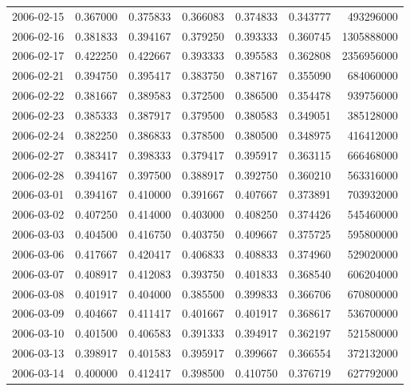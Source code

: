 \begin{tabular}{lrrrrrr}
2006-02-15 &    0.367000 &    0.375833 &    0.366083 &    0.374833 &    0.343777 &   493296000 \\
2006-02-16 &    0.381833 &    0.394167 &    0.379250 &    0.393333 &    0.360745 &  1305888000 \\
2006-02-17 &    0.422250 &    0.422667 &    0.393333 &    0.395583 &    0.362808 &  2356956000 \\
2006-02-21 &    0.394750 &    0.395417 &    0.383750 &    0.387167 &    0.355090 &   684060000 \\
2006-02-22 &    0.381667 &    0.389583 &    0.372500 &    0.386500 &    0.354478 &   939756000 \\
2006-02-23 &    0.385333 &    0.387917 &    0.379500 &    0.380583 &    0.349051 &   385128000 \\
2006-02-24 &    0.382250 &    0.386833 &    0.378500 &    0.380500 &    0.348975 &   416412000 \\
2006-02-27 &    0.383417 &    0.398333 &    0.379417 &    0.395917 &    0.363115 &   666468000 \\
2006-02-28 &    0.394167 &    0.397500 &    0.388917 &    0.392750 &    0.360210 &   563316000 \\
2006-03-01 &    0.394167 &    0.410000 &    0.391667 &    0.407667 &    0.373891 &   703932000 \\
2006-03-02 &    0.407250 &    0.414000 &    0.403000 &    0.408250 &    0.374426 &   545460000 \\
2006-03-03 &    0.404500 &    0.416750 &    0.403750 &    0.409667 &    0.375725 &   595800000 \\
2006-03-06 &    0.417667 &    0.420417 &    0.406833 &    0.408833 &    0.374960 &   529020000 \\
2006-03-07 &    0.408917 &    0.412083 &    0.393750 &    0.401833 &    0.368540 &   606204000 \\
2006-03-08 &    0.401917 &    0.404000 &    0.385500 &    0.399833 &    0.366706 &   670800000 \\
2006-03-09 &    0.404667 &    0.411417 &    0.401667 &    0.401917 &    0.368617 &   536700000 \\
2006-03-10 &    0.401500 &    0.406583 &    0.391333 &    0.394917 &    0.362197 &   521580000 \\
2006-03-13 &    0.398917 &    0.401583 &    0.395917 &    0.399667 &    0.366554 &   372132000 \\
2006-03-14 &    0.400000 &    0.412417 &    0.398500 &    0.410750 &    0.376719 &   627792000 \\

\end{tabular}
